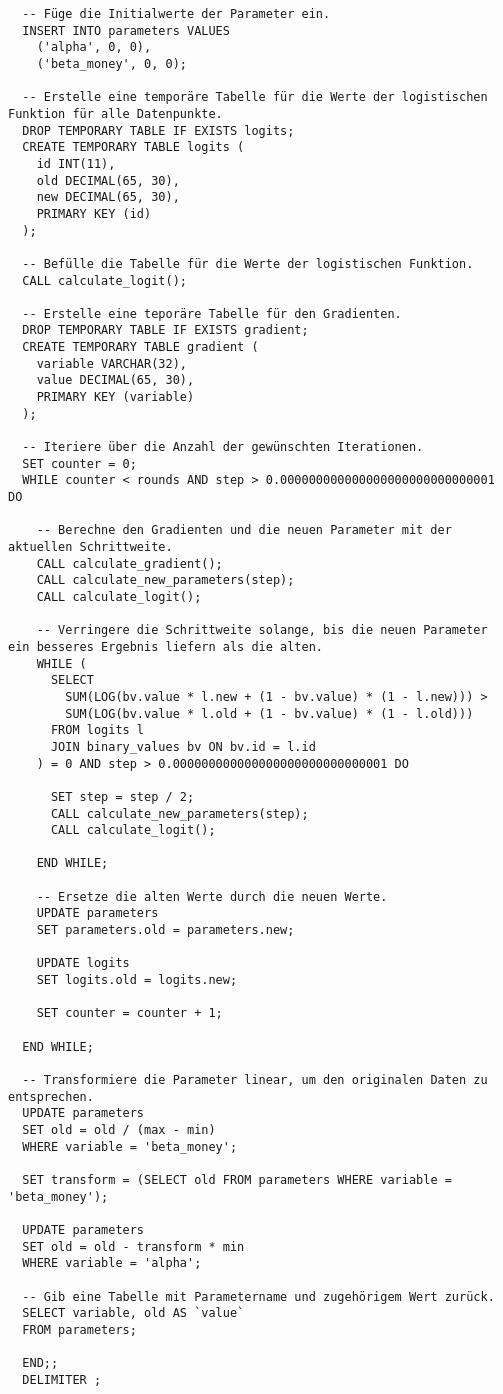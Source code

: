 \begin{verbatim}
  -- Füge die Initialwerte der Parameter ein.
  INSERT INTO parameters VALUES
    ('alpha', 0, 0),
    ('beta_money', 0, 0);

  -- Erstelle eine temporäre Tabelle für die Werte der logistischen Funktion für alle Datenpunkte.
  DROP TEMPORARY TABLE IF EXISTS logits;
  CREATE TEMPORARY TABLE logits (
    id INT(11),
    old DECIMAL(65, 30),
    new DECIMAL(65, 30),
    PRIMARY KEY (id)
  );

  -- Befülle die Tabelle für die Werte der logistischen Funktion.
  CALL calculate_logit();

  -- Erstelle eine teporäre Tabelle für den Gradienten.
  DROP TEMPORARY TABLE IF EXISTS gradient;
  CREATE TEMPORARY TABLE gradient (
    variable VARCHAR(32),
    value DECIMAL(65, 30),
    PRIMARY KEY (variable)
  );

  -- Iteriere über die Anzahl der gewünschten Iterationen.
  SET counter = 0;
  WHILE counter < rounds AND step > 0.000000000000000000000000000001 DO

    -- Berechne den Gradienten und die neuen Parameter mit der aktuellen Schrittweite.
    CALL calculate_gradient();
    CALL calculate_new_parameters(step);
    CALL calculate_logit();

    -- Verringere die Schrittweite solange, bis die neuen Parameter ein besseres Ergebnis liefern als die alten.
    WHILE (
      SELECT
        SUM(LOG(bv.value * l.new + (1 - bv.value) * (1 - l.new))) >
        SUM(LOG(bv.value * l.old + (1 - bv.value) * (1 - l.old)))
      FROM logits l
      JOIN binary_values bv ON bv.id = l.id
    ) = 0 AND step > 0.000000000000000000000000000001 DO

      SET step = step / 2;
      CALL calculate_new_parameters(step);
      CALL calculate_logit();

    END WHILE;

    -- Ersetze die alten Werte durch die neuen Werte.
    UPDATE parameters
    SET parameters.old = parameters.new;

    UPDATE logits
    SET logits.old = logits.new;

    SET counter = counter + 1;

  END WHILE;

  -- Transformiere die Parameter linear, um den originalen Daten zu entsprechen.
  UPDATE parameters
  SET old = old / (max - min)
  WHERE variable = 'beta_money';

  SET transform = (SELECT old FROM parameters WHERE variable = 'beta_money');

  UPDATE parameters
  SET old = old - transform * min
  WHERE variable = 'alpha';

  -- Gib eine Tabelle mit Parametername und zugehörigem Wert zurück.
  SELECT variable, old AS `value`
  FROM parameters;

  END;;
  DELIMITER ;
\end{verbatim}

